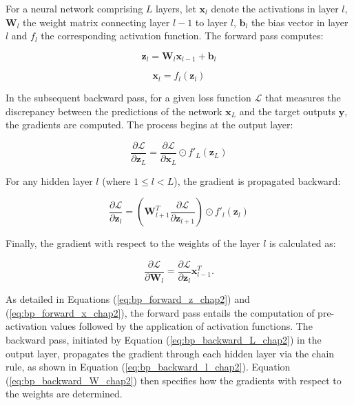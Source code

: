 For a neural network comprising $L$ layers, let $\mathbf{x}_l$ denote the activations in layer $l$, $\mathbf{W}_l$ the weight matrix connecting layer $l-1$ to layer $l$, $\mathbf{b}_l$ the bias vector in layer $l$ and $f_l$ the corresponding activation function. The forward pass computes:

\begin{equation}
\mathbf{z}_l = \mathbf{W}_l\mathbf{x}_{l-1} + \mathbf{b}_l
\tag{2.1}
\label{eq:bp_forward_z_chap2}
\end{equation}

\begin{equation}
\mathbf{x}_l = f_l(\mathbf{z}_l)
\tag{2.2}
\label{eq:bp_forward_x_chap2}
\end{equation}

In the subsequent backward pass, for a given loss function $\mathcal{L}$ that measures the discrepancy between the predictions of the network $\mathbf{x}_L$ and the target outputs $\mathbf{y}$, the gradients are computed. The process begins at the output layer:

\begin{equation}
\frac{\partial \mathcal{L}}{\partial \mathbf{z}_L} = \frac{\partial \mathcal{L}}{\partial \mathbf{x}_L} \odot f'_L(\mathbf{z}_L)
\tag{2.3}
\label{eq:bp_backward_L_chap2}
\end{equation}

For any hidden layer $l$ (where $1 \le l < L$), the gradient is propagated backward:

\begin{equation}
\frac{\partial \mathcal{L}}{\partial \mathbf{z}_l} = \left(\mathbf{W}_{l+1}^T \frac{\partial \mathcal{L}}{\partial \mathbf{z}_{l+1}}\right) \odot f'_l(\mathbf{z}_l)
\tag{2.4}
\label{eq:bp_backward_l_chap2}
\end{equation}

Finally, the gradient with respect to the weights of the layer $l$ is calculated as:

\begin{equation}
\frac{\partial \mathcal{L}}{\partial \mathbf{W}_l} = \frac{\partial \mathcal{L}}{\partial \mathbf{z}_l} \mathbf{x}_{l-1}^T.
\tag{2.5}
\label{eq:bp_backward_W_chap2}
\end{equation}

As detailed in Equations (\ref{eq:bp_forward_z_chap2}) and (\ref{eq:bp_forward_x_chap2}), the forward pass entails the computation of pre-activation values followed by the application of activation functions. The backward pass, initiated by Equation (\ref{eq:bp_backward_L_chap2}) in the output layer, propagates the gradient through each hidden layer via the chain rule, as shown in Equation (\ref{eq:bp_backward_l_chap2}). Equation (\ref{eq:bp_backward_W_chap2}) then specifies how the gradients with respect to the weights are determined.

